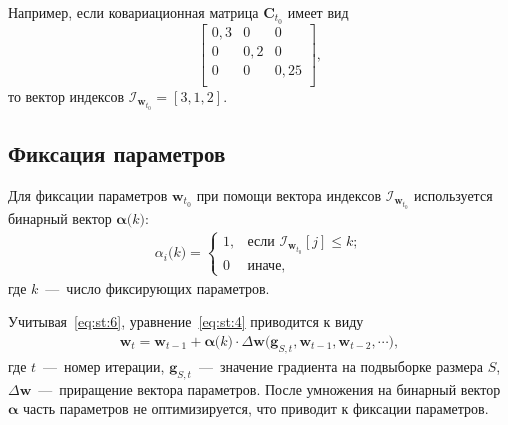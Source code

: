 Например, если ковариационная матрица $\textbf{C}_{t_0}$  имеет вид
 $$
\begin{bmatrix}
0{,}3& 0 & 0\\
0& 0{,}2 & 0\\
0& 0 & 0{,}25\\
\end{bmatrix},
 $$
 то вектор индексов $\mathcal{I}_{\textbf{w}_{t_0}} = [3,1,2]$.
 

\subsection{Фиксация параметров}
Для фиксации параметров $\textbf{w}_{t_0}$ при помощи вектора индексов $\mathcal{I}_{\textbf{w}_{t_0}}$ используется бинарный вектор $\bm{\alpha}\bigr(k\bigr)$:
\begin{equation}
\label{eq:st:6}
\begin{aligned}
\alpha_i\bigr(k\bigr) = \begin{cases}
   1, &\text{если }\mathcal{I}_{\textbf{w}_{t_0}}[j] \leq k;\\
   0 &\text{иначе},
 \end{cases}
\end{aligned}
\end{equation}
 где $k$~---~число фиксирующих параметров.
 
 Учитывая~\eqref{eq:st:6}, уравнение~\eqref{eq:st:4} приводится к виду
 \begin{equation}
\label{eq:st:7}
\begin{aligned}
\textbf{w}_{t} = \textbf{w}_{t-1} + \bm{\alpha}\bigr(k\bigr)\cdot\Delta\textbf{w}\bigr(\textbf{g}_{S,t}, \textbf{w}_{t-1}, \textbf{w}_{t-2}, \cdots\bigr),
\end{aligned}
\end{equation}
где $t$~---~номер итерации, $\textbf{g}_{S,t}$~---~значение градиента на подвыборке размера $S$, $\Delta\textbf{w}$~---~приращение вектора параметров. После умножения на бинарный вектор $\bm\alpha$ часть параметров не оптимизируется, что приводит к фиксации параметров.
